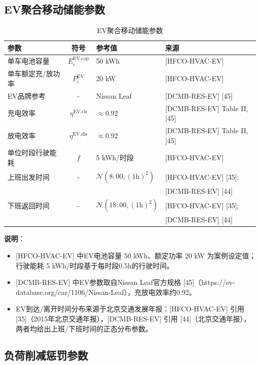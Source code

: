\documentclass[11pt]{ctexart}
\begin{document}
\subsection{EV聚合移动储能参数}

\begin{table}[htbp]
\centering
\caption{EV聚合移动储能参数}
\begin{tabular}{lcll}
\hline
参数 & 符号 & 参考值 & 来源 \\
\hline
单车电池容量 & $E^{\text{EV,cap}}_{i}$ & 50 kWh & {[HFCO-HVAC-EV]} \\
单车额定充/放功率 & $P^{\text{EV}}_{i}$ & 20 kW & {[HFCO-HVAC-EV]} \\
EV品牌参考 & - & Nissan Leaf & {[DCMB-RES-EV]} {[45]} \\
充电效率 & $\eta^{\text{EV,ch}}$ & $\approx$0.92 & {[DCMB-RES-EV]} Table II, {[45]} \\
放电效率 & $\eta^{\text{EV,dis}}$ & $\approx$0.92 & {[DCMB-RES-EV]} Table II, {[45]} \\
单位时段行驶能耗 & $f$ & 5 kWh/时段 & {[HFCO-HVAC-EV]} \\
上班出发时间 & - & $\mathcal{N}(8{:}00, (1\text{h})^{2})$ & {[HFCO-HVAC-EV]} {[35]}; \\
 & & & {[DCMB-RES-EV]} {[44]} \\
下班返回时间 & - & $\mathcal{N}(18{:}00, (1\text{h})^{2})$ & {[HFCO-HVAC-EV]} {[35]}; \\
 & & & {[DCMB-RES-EV]} {[44]} \\
\hline
\end{tabular}
\end{table}

\textbf{说明}：
\begin{itemize}[leftmargin=2em, itemsep=2pt, topsep=2pt]
    \item {[HFCO-HVAC-EV]} 中EV电池容量 50 kWh、额定功率 20 kW 为案例设定值；行驶能耗 5 kWh/时段基于每时段0.5h的行驶时间。
    \item {[DCMB-RES-EV]} 中EV参数取自Nissan Leaf官方规格 {[45]}（https://ev-database.org/car/1106/Nissan-Leaf），充放电效率约0.92。
    \item EV到达/离开时间分布来源于北京交通发展年报：{[HFCO-HVAC-EV]} 引用 {[35]}（2015年北京交通年报），{[DCMB-RES-EV]} 引用 {[44]}（北京交通年报），两者均给出上班/下班时间的正态分布参数。
\end{itemize}

\subsection{负荷削减惩罚参数}
\end{document}
